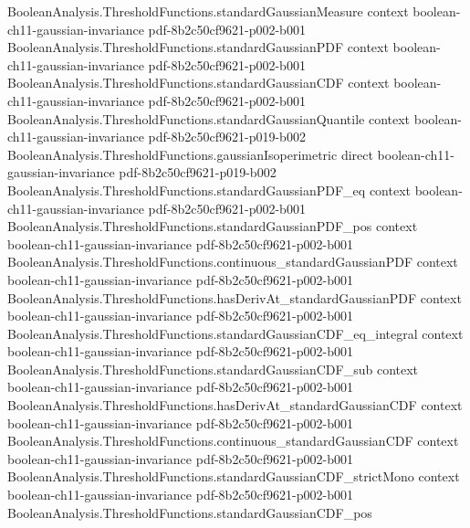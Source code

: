 \begin{lemma}
\leanok
{}
\proofstep
  {BooleanAnalysis.ThresholdFunctions.standardGaussianMeasure}
  {context}
  {boolean-ch11-gaussian-invariance}
  {pdf-8b2c50cf9621-p002-b001}
\proofstep
  {BooleanAnalysis.ThresholdFunctions.standardGaussianPDF}
  {context}
  {boolean-ch11-gaussian-invariance}
  {pdf-8b2c50cf9621-p002-b001}
\proofstep
  {BooleanAnalysis.ThresholdFunctions.standardGaussianCDF}
  {context}
  {boolean-ch11-gaussian-invariance}
  {pdf-8b2c50cf9621-p002-b001}
\proofstep
  {BooleanAnalysis.ThresholdFunctions.standardGaussianQuantile}
  {context}
  {boolean-ch11-gaussian-invariance}
  {pdf-8b2c50cf9621-p019-b002}
\proofstep
  {BooleanAnalysis.ThresholdFunctions.gaussianIsoperimetric}
  {direct}
  {boolean-ch11-gaussian-invariance}
  {pdf-8b2c50cf9621-p019-b002}
\proofstep
  {BooleanAnalysis.ThresholdFunctions.standardGaussianPDF_eq}
  {context}
  {boolean-ch11-gaussian-invariance}
  {pdf-8b2c50cf9621-p002-b001}
\proofstep
  {BooleanAnalysis.ThresholdFunctions.standardGaussianPDF_pos}
  {context}
  {boolean-ch11-gaussian-invariance}
  {pdf-8b2c50cf9621-p002-b001}
\proofstep
  {BooleanAnalysis.ThresholdFunctions.continuous_standardGaussianPDF}
  {context}
  {boolean-ch11-gaussian-invariance}
  {pdf-8b2c50cf9621-p002-b001}
\proofstep
  {BooleanAnalysis.ThresholdFunctions.hasDerivAt_standardGaussianPDF}
  {context}
  {boolean-ch11-gaussian-invariance}
  {pdf-8b2c50cf9621-p002-b001}
\proofstep
  {BooleanAnalysis.ThresholdFunctions.standardGaussianCDF_eq_integral}
  {context}
  {boolean-ch11-gaussian-invariance}
  {pdf-8b2c50cf9621-p002-b001}
\proofstep
  {BooleanAnalysis.ThresholdFunctions.standardGaussianCDF_sub}
  {context}
  {boolean-ch11-gaussian-invariance}
  {pdf-8b2c50cf9621-p002-b001}
\proofstep
  {BooleanAnalysis.ThresholdFunctions.hasDerivAt_standardGaussianCDF}
  {context}
  {boolean-ch11-gaussian-invariance}
  {pdf-8b2c50cf9621-p002-b001}
\proofstep
  {BooleanAnalysis.ThresholdFunctions.continuous_standardGaussianCDF}
  {context}
  {boolean-ch11-gaussian-invariance}
  {pdf-8b2c50cf9621-p002-b001}
\proofstep
  {BooleanAnalysis.ThresholdFunctions.standardGaussianCDF_strictMono}
  {context}
  {boolean-ch11-gaussian-invariance}
  {pdf-8b2c50cf9621-p002-b001}
\proofstep
  {BooleanAnalysis.ThresholdFunctions.standardGaussianCDF_pos}

\end{lemma}
